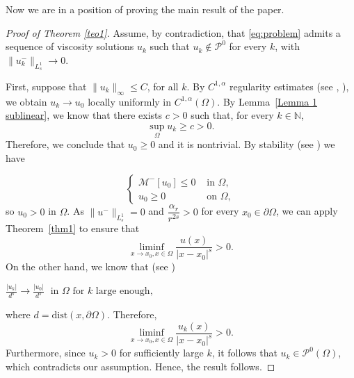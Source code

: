 \documentclass[11pt]{article}
\begin{document}
Now we are in a position of proving the main result of the paper.

\begin{proof}[Proof of Theorem \ref{teo1}]
 Assume, by contradiction, that \eqref{eq:problem} admits a sequence of viscosity solutions \(u_k\) such that \(u_k\notin\mathcal{P}^{0}\) for every \(k\), with $\|u_k^{-}\|_{L^{1}_{s}}\rightarrow 0$.

First, suppose that \(\| u_{k}\|_{\infty} \leq C\), for all \(k\). By \(C^{1,\alpha}\) regularity estimates (see \cite{birindelli2014}, \cite{imbert2013c1}), we obtain \(u_{k} \to u_{0}\) locally uniformly in \(C^{1,\alpha}(\Omega)\). By Lemma~\ref{Lemma 1 sublinear}, we know that there exists $c>0$ such that, for every \(k\in\mathbb{N}\), \[\sup_\Omega u_k \geq c >0 .\]
Therefore, we conclude that $u_0\geq 0$ and it is nontrivial. By stability (see \cite{caffarelli2011regularity}) we have 

\begin{equation*}
    \begin{cases}
    \mathcal{M}^{-}[u_0] \leq 0 & \text{ in } \Omega, \\ 
    u_0\geq0 & \text{ on }\Omega,
    \end{cases}
\end{equation*}
so $u_0>0$ in $\Omega$. As $\|u^-\|_{L^1_s}= 0$ and $\dfrac{\alpha _{r}}{r^{2s}}>0$ for every $x_0\in \partial\Omega$, we can apply Theorem~\ref{thm1} to ensure that
\begin{equation}
        \liminf_{x\to x_0, x\in\Omega}\frac{u(x)}{|x-x_{0}|^{s}}>0.
\end{equation}
On the other hand, we know that (see \cite[Proposition~1.1]{ros2016boundary})

\begin{center}
    $\frac{|u_k|}{d^{s}}\to \frac{|u_0|}{d^{s}}\;\text{ in $\Omega$ for \(k\) large enough,}$
\end{center}
where $d=\mathrm{dist}(x,\partial \Omega)$. Therefore, 
\begin{equation}
        \liminf_{x\to x_0, x\in\Omega}\frac{u_k(x)}{|x-x_{0}|^{s}}>0.
\end{equation}
Furthermore, since $u_k>0$ for sufficiently large $k$, it follows that $u_k\in\mathcal{P}^{0}(\Omega)$, which contradicts our assumption. Hence, the result follows.


\end{proof}
\end{document}
